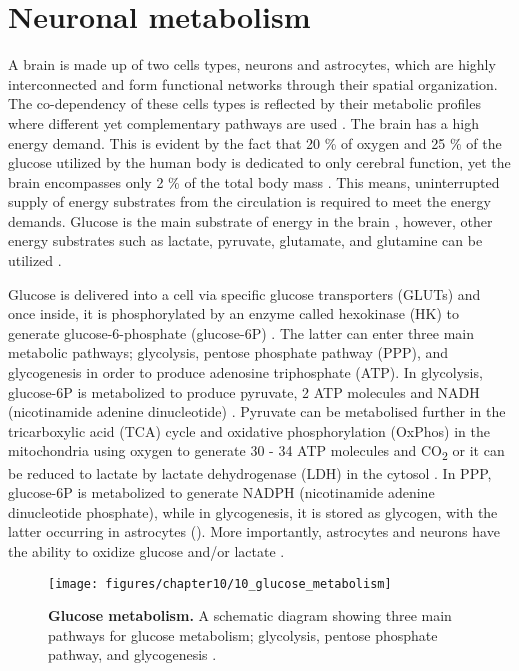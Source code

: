 \section{Neuronal metabolism}
A brain is made up of two cells types, neurons and astrocytes, which are highly interconnected and form functional networks through their spatial organization. The co-dependency of these cells types is reflected by their metabolic profiles where different yet complementary pathways are used \citep{Belanger2011,Schonfeld2013}. The brain has a high energy demand. This is evident by the fact that 20 \% of oxygen and 25 \% of the glucose utilized by the human body is dedicated to only cerebral function, yet the brain encompasses only 2 \% of the total body mass \citep{Belanger2011}. This means, uninterrupted supply of energy substrates from the circulation is required to meet the energy demands. Glucose is the main substrate of energy in the brain 
\citep{Dienel2012,Pellerin2012}, however, other energy substrates such as lactate, pyruvate, glutamate, and glutamine can be utilized \citep{Zielke2009}.

Glucose is delivered into a cell via specific glucose transporters (GLUTs) and once inside, it is phosphorylated by an enzyme called hexokinase (HK) to generate glucose-6-phosphate (glucose-6P) \citep{Belanger2011,Herrero-Mendez2009}. The latter can enter three main metabolic pathways; glycolysis, pentose phosphate pathway (PPP), and glycogenesis in order to produce adenosine triphosphate (ATP). In glycolysis, glucose-6P is metabolized to produce pyruvate, 2 ATP molecules and NADH (nicotinamide adenine dinucleotide) \citep{Belanger2011}. Pyruvate can be metabolised further in the tricarboxylic acid (TCA) cycle and oxidative phosphorylation (OxPhos) in the mitochondria using oxygen to generate 30 - 34 ATP molecules and CO\textsubscript{2} or it can be reduced to lactate by lactate dehydrogenase (LDH) in the cytosol \citep{Belanger2011}. In PPP, glucose-6P is metabolized to generate NADPH (nicotinamide adenine dinucleotide phosphate), while in glycogenesis, it is stored as glycogen, with the latter occurring in astrocytes \citep{Belanger2011} (). More importantly, astrocytes and neurons have the ability to oxidize glucose and/or lactate \citep{Zielke2009}.

\begin{figure}[!htbp]
  \texttt{[image: figures/chapter10/10\_glucose\_metabolism]}
  \caption[Glucose metabolism]{\textbf{Glucose metabolism.} A schematic diagram showing three main pathways for glucose metabolism; glycolysis, pentose phosphate pathway, and glycogenesis \citep{Belanger2011} .}
  \label{fig:10_glucose_metabolism}
\end{figure}

